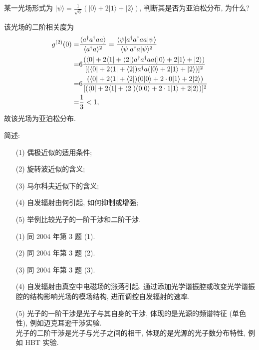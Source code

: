 \documentclass{assignment}
\begin{document}
\begin{prob}
    某一光场形式为 $\lvert\psi\rangle=\frac{1}{\sqrt{6}}(\lvert 0\rangle+2\lvert 1\rangle+\lvert 2\rangle)$, 判断其是否为亚泊松分布, 为什么?
\end{prob}
\begin{sol}
    该光场的二阶相关度为
    \begin{align}
        \notag g^{(2)}(0)=&\frac{\langle a^{\dagger}a^{\dagger}aa\rangle}{\langle a^{\dagger}a\rangle^2}=\frac{\langle\psi\rvert a^{\dagger}a^{\dagger}aa\lvert\psi\rangle}{\langle\psi\rvert a^{\dagger}a\lvert\psi\rangle^2}\\
        \notag=&6\frac{(\langle 0\rvert+2\langle 1\rvert+\langle 2\rvert)a^{\dagger}a^{\dagger}aa(\lvert 0\rangle+2\lvert 1\rangle+\lvert 2\rangle)}{[(\langle 0\rvert+2\langle 1\rvert+\langle 2\rvert)a^{\dagger}a(\lvert 0\rangle+2\lvert 1\rangle+\lvert 2\rangle)]^2}\\
        \notag=&6\frac{(\langle 0\rvert+2\langle 1\rvert+\langle 2\rvert)(0\lvert 0\rangle+2\cdot 0\lvert 1\rangle+2\lvert 2\rangle)}{[(\langle 0\rvert+2\langle 1\rvert+\langle 2\rvert)(0\lvert 0\rangle+2\cdot 1\lvert 1\rangle+2\lvert 2\rangle)]^2}\\
        =&\frac{1}{3}<1,
    \end{align}
    故该光场为亚泊松分布.
\end{sol}

\begin{prob}
    简述:
    \begin{itemize}
        \item[(1)] 偶极近似的适用条件;
        \item[(2)] 旋转波近似的含义;
        \item[(3)] 马尔科夫近似下的含义;
        \item[(4)] 自发辐射由何引起, 如何抑制或增强;
        \item[(5)] 举例比较光子的一阶干涉和二阶干涉.
    \end{itemize}
\end{prob}
\begin{sol}
    \begin{itemize}
        \item[(1)] 同 2004 年第 3 题 (1).
        \item[(2)] 同 2004 年第 3 题 (2).
        \item[(3)] 同 2004 年第 3 题 (3).
        \item[(4)] 自发辐射由真空中电磁场的涨落引起. 通过添加光学谐振腔或改变光学谐振腔的结构影响光场的模场结构, 进而调控自发辐射的速率.
        \item[(5)] 光子的一阶干涉是光子与其自身的干涉, 体现的是光源的频谱特征 (单色性), 例如迈克耳逊干涉实验.\\
        光子的二阶干涉是光子与光子之间的相干, 体现的是光源的光子数分布特性, 例如 HBT 实验.
    \end{itemize}
\end{sol}
\end{document}
